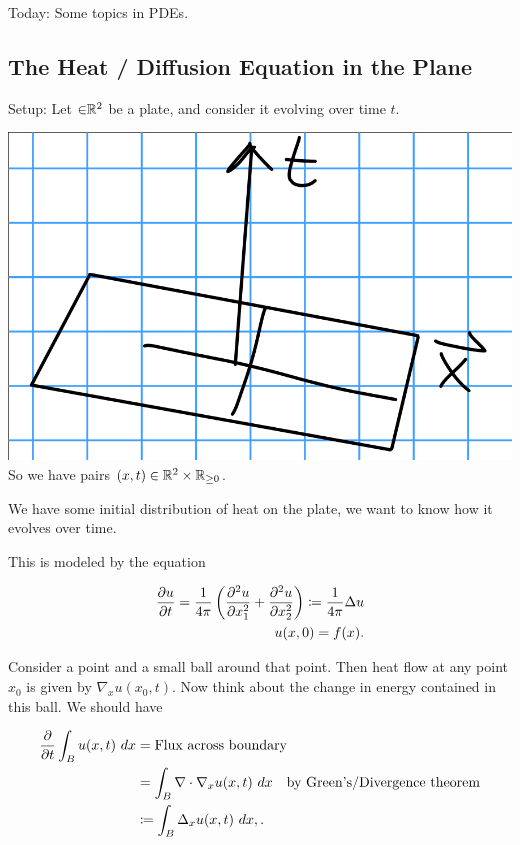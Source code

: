 Today: Some topics in PDEs.

\hypertarget{the-heat-diffusion-equation-in-the-plane}{%
\subsection{The Heat / Diffusion Equation in the
Plane}\label{the-heat-diffusion-equation-in-the-plane}}

Setup: Let \(\mathbf{\in} {\mathbb{R}}^2\) be a plate, and consider it evolving
over time \(t\).

\includegraphics{figures/2019-10-31-11:29.png}\\

So we have pairs \((x, t) \in {\mathbb{R}}^2 \times {\mathbb{R}}_{\geq 0}\).

We have some initial distribution of heat on the plate, we want to know
how it evolves over time.

This is modeled by the equation

\begin{align*}
{\frac{\partial u}{\partial t}} = \frac{1}{4\pi} \left( {\frac{\partial ^2 u}{\partial x_1^2}} + {\frac{\partial ^2u}{\partial x_2^2}} \right) \coloneqq \frac{1}{4\pi} \Delta u\\
u(x, 0) = f(x)
.\end{align*}

Consider a point and a small ball around that point. Then heat flow at
any point \(x_0\) is given by \(\nabla_x u(x_0, t)\). Now think about
the change in energy contained in this ball. We should have

\begin{align*}
{\frac{\partial }{\partial t}} \int_{B} u(x, t) ~dx &= \text{Flux across boundary} \\
&= \int_B \nabla \cdot \nabla_x u(x, t) ~dx \quad  \text{by Green's/Divergence theorem} \\
&\coloneqq \int_B \Delta_x u(x, t) ~dx,
.\end{align*}

